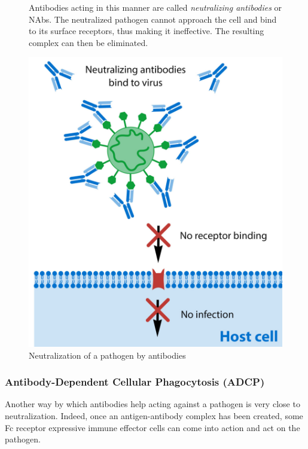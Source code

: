 \begin{figure}[H]
\begin{minipage}{0.55\textwidth}
        Antibodies acting in this manner are called \emph{neutralizing antibodies}
        or NAbs. The neutralized pathogen cannot approach the cell and
        bind to its surface receptors, thus making it ineffective. 
        The resulting complex can then be eliminated.
    \end{minipage}\hfill
    \begin{minipage}{0.35\textwidth}
        \centering
        \includegraphics[width=\textwidth]{../Images/neutralization.png}   
        \caption{Neutralization of a pathogen by antibodies}
        \label{fig:neutralization}
    \end{minipage}
\end{figure}


\subsubsection{Antibody-Dependent Cellular Phagocytosis (ADCP)}

Another way by which antibodies help acting against a pathogen is very
close to neutralization. Indeed, once an antigen-antibody complex has been
created, some Fc receptor expressive immune effector cells can come into action
and act on the pathogen. 

